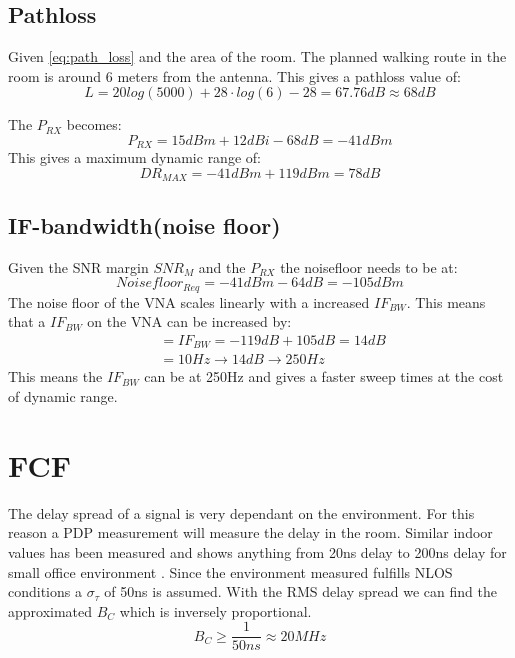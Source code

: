 \subsection{Pathloss}
Given \autoref{eq:path_loss} and the area of the room. The planned walking route in the room is around 6 meters from the antenna. This gives a pathloss value of:
\begin{equation}
L = 20log (5000) + 28 \cdot log(6)-28 = 67.76dB \approx 68dB
\label{eq:path_loss}
\end{equation}

The $P_{RX}$ becomes:
\begin{equation}
P_{RX} = 15dBm + 12dBi - 68dB = -41dBm
\end{equation}
This gives a maximum dynamic range of:
\begin{equation}
DR_{MAX} = -41dBm+119dBm = 78dB
\end{equation}


\subsection{IF-bandwidth(noise floor)}
Given the SNR margin $SNR_{M}$ and the $P_{RX}$ the noisefloor needs to be at:
\begin{equation}
Noisefloor_{Req} = -41dBm-64dB = -105dBm 
\end{equation}
The noise floor of the \gls{VNA} scales linearly with a increased $IF_{BW}$\citep{PNA_scale}. This means that a $IF_{BW}$ on the \gls{VNA} can be increased by:
\begin{equation}
\begin{split}
&= IF_{BW} = -119dB+105dB = 14dB \\
          \quad &= 10Hz \rightarrow 14dB \rightarrow 250Hz
\end{split}
\end{equation}
This means the $IF_{BW}$ can be at 250Hz and gives a faster sweep times at the cost of dynamic range.
\section{FCF}
The delay spread of a signal is very dependant on the environment. For this reason a PDP measurement will measure the delay in the room. Similar indoor values has been measured and shows anything from 20ns delay to 200ns delay for small office environment \citep{indoor_delay}. Since the environment  measured fulfills NLOS conditions a $\sigma_{\tau}$ of 50ns is assumed. With the RMS delay spread we can find the approximated $B_C$ which is inversely proportional. 
\begin{equation}
B_C \geq \frac{1}{50ns} \approx 20MHz
\label{CohBW}
\end{equation}
